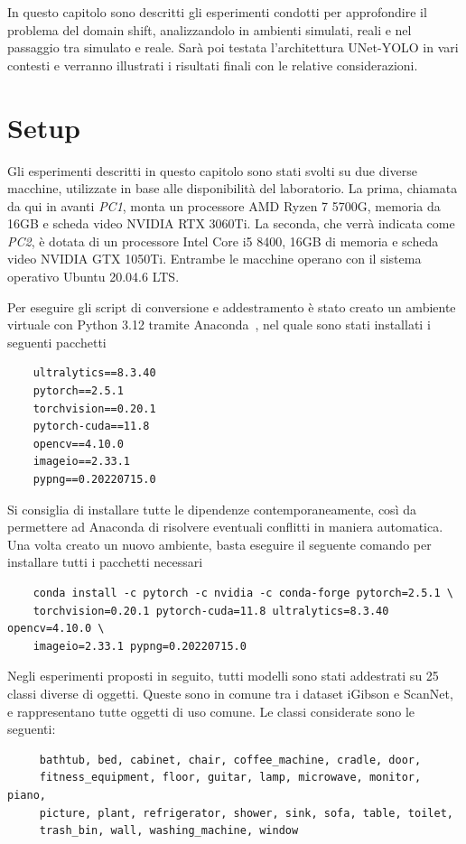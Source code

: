 \documentclass[12pt]{report}
\begin{document}
In questo capitolo sono descritti gli esperimenti condotti per approfondire il problema del domain shift, analizzandolo in ambienti simulati, reali e nel passaggio tra simulato e reale. Sarà poi testata l'architettura UNet-YOLO in vari contesti e verranno illustrati i risultati finali con le relative considerazioni.

\section{Setup}
\label{sec:setup}

Gli esperimenti descritti in questo capitolo sono stati svolti su due diverse macchine, utilizzate in base alle disponibilità del laboratorio. La prima, chiamata da qui in avanti \textit{PC1}, monta un processore AMD Ryzen 7 5700G, memoria da 16GB e scheda video NVIDIA RTX 3060Ti. La seconda, che verrà indicata come \textit{PC2}, è dotata di un processore Intel Core i5 8400, 16GB di memoria e scheda video NVIDIA GTX 1050Ti. Entrambe le macchine operano con il sistema operativo Ubuntu 20.04.6 LTS.

Per eseguire gli script di conversione e addestramento è stato creato un ambiente virtuale con Python 3.12 tramite Anaconda~\cite{anaconda}, nel quale sono stati installati i seguenti pacchetti

\begin{verbatim}
	ultralytics==8.3.40
	pytorch==2.5.1
	torchvision==0.20.1
	pytorch-cuda==11.8
	opencv==4.10.0
	imageio==2.33.1
	pypng==0.20220715.0
\end{verbatim}

Si consiglia di installare tutte le dipendenze contemporaneamente, così da permettere ad Anaconda di risolvere eventuali conflitti in maniera automatica. Una volta creato un nuovo ambiente, basta eseguire il seguente comando per installare tutti i pacchetti necessari

\begin{verbatim}
	conda install -c pytorch -c nvidia -c conda-forge pytorch=2.5.1 \
	torchvision=0.20.1 pytorch-cuda=11.8 ultralytics=8.3.40 opencv=4.10.0 \
	imageio=2.33.1 pypng=0.20220715.0
\end{verbatim}

Negli esperimenti proposti in seguito, tutti modelli sono stati addestrati su 25 classi diverse di oggetti. Queste sono in comune tra i dataset iGibson e ScanNet, e rappresentano tutte oggetti di uso comune. Le classi considerate sono le seguenti:

\begin{verbatim}
	 bathtub, bed, cabinet, chair, coffee_machine, cradle, door,
	 fitness_equipment, floor, guitar, lamp, microwave, monitor, piano,
	 picture, plant, refrigerator, shower, sink, sofa, table, toilet,
	 trash_bin, wall, washing_machine, window
	
\end{verbatim}
\end{document}
